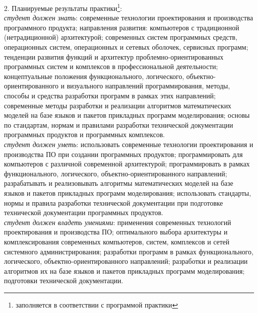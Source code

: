 \documentclass[12pt,a4paper]{scrartcl}
\begin{document}
		2. Планируемые результаты практики\footnote{заполняется в соответствии с программой практики}:\\
		\textit{студент должен знать}: современные технологии проектирования и производства программного продукта; направления развития: компьютеров с традиционной (нетрадиционной) архитектурой; современных систем программных средств, операционных систем, операционных и сетевых оболочек, сервисных программ; тенденции развития функций и архитектур проблемно-ориентированных программных систем и комплексов в профессиональной деятельности; концептуальные положения функционального, логического, объектно-ориентированного и визуального направлений программирования, методы, способы и средства разработки программ в рамках этих направлений; современные методы разработки и реализации алгоритмов математических моделей на базе языков и пакетов прикладных программ моделирования; основы по стандартам, нормам и правилами разработки технической документации программных продуктов и программных комплексов. \\
		\textit{студент должен уметь}: использовать современные технологии проектирования и производства ПО при создании программных продуктов; программировать для компьютеров с различной современной архитектурой; программировать в рамках функционального, логического, объектно-ориентированного направлений; разрабатывать и реализовывать алгоритмы математических моделей на базе языков и пакетов прикладных программ моделирования; использовать стандарты, нормы и правила разработки технической документации при подготовке технической документации программных продуктов. \\
		\textit{студент должен владеть умениями}: применения современных технологий проектирования и производства ПО; оптимального выбора архитектуры и комплексирования современных компьютеров, систем, комплексов и сетей системного администрирования; разработки программ в рамках функционального, логического, объектно-ориентированного направлений; разработки и реализации алгоритмов их на базе языков и пакетов прикладных программ моделирования; подготовки технической документации.
		
\end{document}
